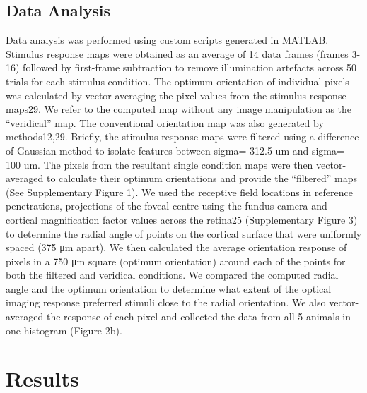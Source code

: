 	\subsection{Data Analysis}
	Data analysis was performed using custom scripts generated in MATLAB. Stimulus response
	maps were obtained as an average of 14 data frames (frames 3-16) followed by first-frame
	subtraction to remove illumination artefacts across 50 trials for each stimulus condition. The
	optimum orientation of individual pixels was calculated by vector-averaging the pixel values
	from the stimulus response maps29. We refer to the computed map without any image
	manipulation as the “veridical” map. The conventional orientation map was also generated by
	methods12,29. Briefly, the stimulus response maps were filtered using a difference of Gaussian
	method to isolate features between sigma= 312.5 um and sigma= 100 um. The pixels from the
	resultant single condition maps were then vector-averaged to calculate their optimum
	orientations and provide the “filtered” maps (See Supplementary Figure 1).
	We used the receptive field locations in reference penetrations, projections of the foveal centre
	using the fundus camera and cortical magnification factor values across the retina25
	(Supplementary Figure 3) to determine the radial angle of points on the cortical surface that
	were uniformly spaced (375 μm apart). We then calculated the average orientation response of
	pixels in a 750 μm square (optimum orientation) around each of the points for both the filtered
	and veridical conditions. We compared the computed radial angle and the optimum orientation to
	determine what extent of the optical imaging response preferred stimuli close to the radial
	orientation. We also vector-averaged the response of each pixel and collected the data from all 5
	animals in one histogram (Figure 2b).

	\section{Results}
	

